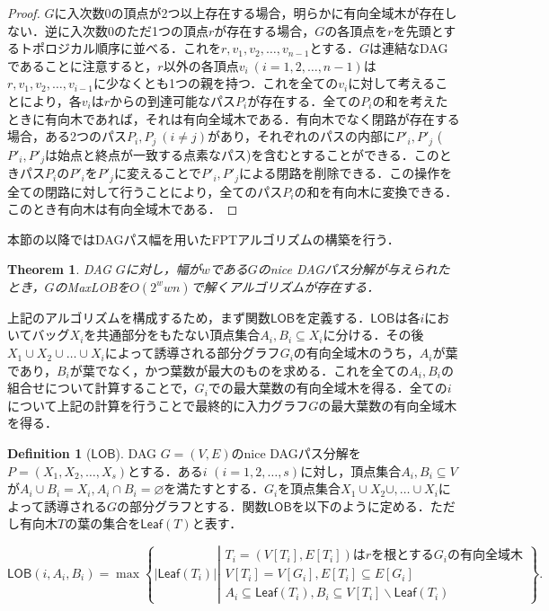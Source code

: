 \documentclass[master]{kuisthesis}		%
\theoremstyle{plain}
\newtheorem{theorem}{Theorem}
\theoremstyle{definition}
\newtheorem{definition*}{Definition}
\begin{document}
\begin{proof}
    $G$に入次数0の頂点が2つ以上存在する場合，明らかに有向全域木が存在しない．逆に入次数0のただ1つの頂点$r$が存在する場合，$G$の各頂点を$r$を先頭とするトポロジカル順序に並べる．これを$r, v_1, v_2, \dots, v_{n-1}$とする．$G$は連結なDAGであることに注意すると，$r$以外の各頂点$v_i\ (i=1, 2, \dots, n-1)$は$r, v_1, v_2, \dots, v_{i-1}$に少なくとも1つの親を持つ．これを全ての$v_i$に対して考えることにより，各$v_i$は$r$からの到達可能なパス$P_i$が存在する．全ての$P_i$の和を考えたときに有向木であれば，それは有向全域木である．有向木でなく閉路が存在する場合，ある2つのパス$P_i, P_j\ (i\neq j)$があり，それぞれのパスの内部に$P'_i, P'_j$ ($P'_i, P'_j$は始点と終点が一致する点素なパス)を含むとすることができる．このときパス$P_i$の$P'_i$を$P'_j$に変えることで$P'_i, P'_j$による閉路を削除できる．この操作を全ての閉路に対して行うことにより，全てのパス$P_i$の和を有向木に変換できる．このとき有向木は有向全域木である．
\end{proof}


本節の以降ではDAGパス幅を用いたFPTアルゴリズムの構築を行う．

\begin{theorem}
    DAG $G$に対し，幅が$w$である$G$のnice DAGパス分解が与えられたとき，$G$のMaxLOBを$O(2^wwn)$で解くアルゴリズムが存在する．
\end{theorem}



上記のアルゴリズムを構成するため，まず関数$\mathsf{LOB}$を定義する．$\mathsf{LOB}$は各$i$においてバッグ$X_i$を共通部分をもたない頂点集合$A_i, B_i \subseteq X_i$に分ける．その後$X_1 \cup X_2 \cup \dots \cup X_i$によって誘導される部分グラフ$G_i$の有向全域木のうち，$A_i$が葉であり，$B_i$が葉でなく，かつ葉数が最大のものを求める．これを全ての$A_i, B_i$の組合せについて計算することで，$G_i$での最大葉数の有向全域木を得る．全ての$i$について上記の計算を行うことで最終的に入力グラフ$G$の最大葉数の有向全域木を得る．


\begin{definition*}[$\mathsf{LOB}$]
    DAG $G=(V, E)$のnice DAGパス分解を$P=(X_1, X_2, \dots , X_s)$とする．ある$i$ $(i=1, 2, \dots , s)$に対し，頂点集合$A_i, B_i \subseteq V$が$A_i \cup B_i = X_i, A_i \cap B_i = \varnothing$を満たすとする．$G_i$を頂点集合$X_1 \cup X_2 \cup,  \dots \cup X_i$によって誘導される$G$の部分グラフとする．関数$\mathsf{LOB}$を以下のように定める．ただし有向木$T$の葉の集合を$\mathsf{Leaf}(T)$と表す．

    \begin{equation}\label{def_lob}
        \mathsf{LOB}(i, A_i, B_i) = \max \left\{ |\mathsf{Leaf}(T_i)| \left |
        \begin{array}{l}
            T_i = (V[T_i], E[T_i]) \text{は} r \text{を根とする} G_i \text{の有向全域木} \\
            V[T_i] = V[G_i], E[T_i] \subseteq E[G_i]\\
            A_i \subseteq \mathsf{Leaf}(T_i), B_i \subseteq V[T_i] \backslash \mathsf{Leaf}(T_i)
        \end{array}
        \right. \right\}.
    \end{equation}
\end{definition*}
\end{document}
